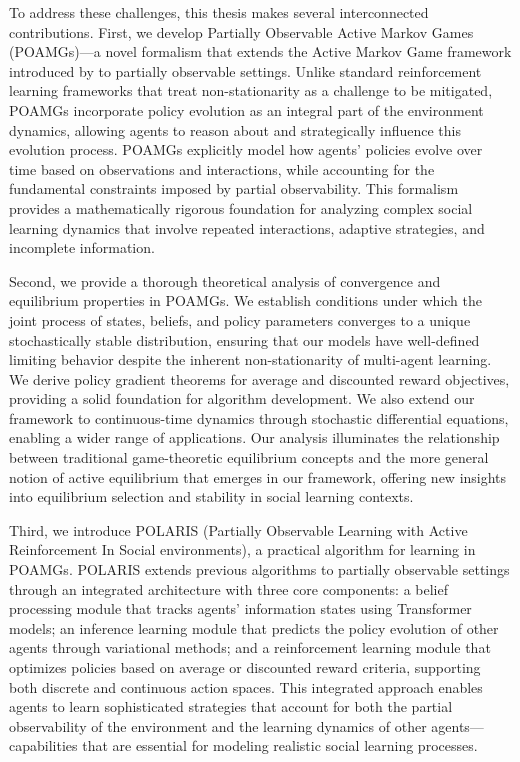 To address these challenges, this thesis makes several interconnected contributions. First, we develop Partially Observable Active Markov Games (POAMGs)—a novel formalism that extends the Active Markov Game framework introduced by \citet{kim2022influencing} to partially observable settings. Unlike standard reinforcement learning frameworks that treat non-stationarity as a challenge to be mitigated, POAMGs incorporate policy evolution as an integral part of the environment dynamics, allowing agents to reason about and strategically influence this evolution process. POAMGs explicitly model how agents' policies evolve over time based on observations and interactions, while accounting for the fundamental constraints imposed by partial observability. This formalism provides a mathematically rigorous foundation for analyzing complex social learning dynamics that involve repeated interactions, adaptive strategies, and incomplete information.

Second, we provide a thorough theoretical analysis of convergence and equilibrium properties in POAMGs. We establish conditions under which the joint process of states, beliefs, and policy parameters converges to a unique stochastically stable distribution, ensuring that our models have well-defined limiting behavior despite the inherent non-stationarity of multi-agent learning. We derive policy gradient theorems for average and discounted reward objectives, providing a solid foundation for algorithm development. We also extend our framework to continuous-time dynamics through stochastic differential equations, enabling a wider range of applications. Our analysis illuminates the relationship between traditional game-theoretic equilibrium concepts and the more general notion of active equilibrium that emerges in our framework, offering new insights into equilibrium selection and stability in social learning contexts.

Third, we introduce POLARIS (Partially Observable Learning with Active Reinforcement In Social environments), a practical algorithm for learning in POAMGs. POLARIS extends previous algorithms to partially observable settings through an integrated architecture with three core components: a belief processing module that tracks agents' information states using Transformer models; an inference learning module that predicts the policy evolution of other agents through variational methods; and a reinforcement learning module that optimizes policies based on average or discounted reward criteria, supporting both discrete and continuous action spaces. This integrated approach enables agents to learn sophisticated strategies that account for both the partial observability of the environment and the learning dynamics of other agents—capabilities that are essential for modeling realistic social learning processes.


